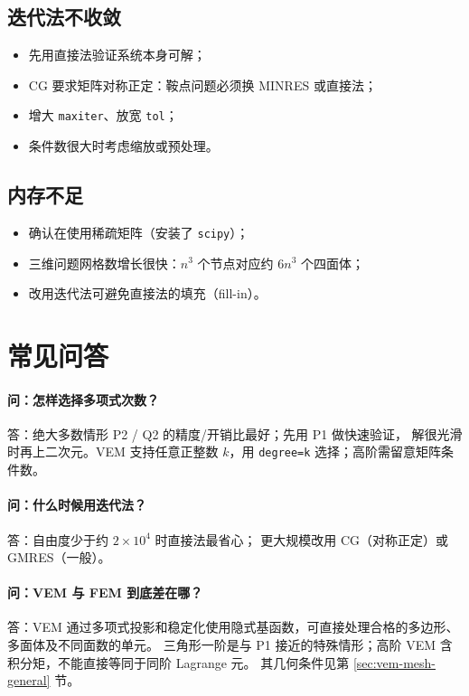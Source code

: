 \documentclass[UTF8,11pt,oneside]{ctexbook}
\theoremstyle{definition}
\theoremstyle{plain}
\newcommand{\code}[1]{\texttt{#1}}
\begin{document}
\subsection{迭代法不收敛}

\begin{itemize}[itemsep=0.2em]
  \item 先用直接法验证系统本身可解；
  \item CG 要求矩阵对称正定：鞍点问题必须换 MINRES 或直接法；
  \item 增大 \code{maxiter}、放宽 \code{tol}；
  \item 条件数很大时考虑缩放或预处理。
\end{itemize}

\subsection{内存不足}

\begin{itemize}[itemsep=0.2em]
  \item 确认在使用稀疏矩阵（安装了 \code{scipy}）；
  \item 三维问题网格数增长很快：$n^3$ 个节点对应约 $6n^3$ 个四面体；
  \item 改用迭代法可避免直接法的填充（fill-in）。
\end{itemize}

\section{常见问答}

\paragraph{问：怎样选择多项式次数？}
答：绝大多数情形 P2 / Q2 的精度/开销比最好；先用 P1 做快速验证，
解很光滑时再上二次元。VEM 支持任意正整数 $k$，用 \code{degree=k} 选择；高阶需留意矩阵条件数。

\paragraph{问：什么时候用迭代法？}
答：自由度少于约 $2\times10^4$ 时直接法最省心；
更大规模改用 CG（对称正定）或 GMRES（一般）。

\paragraph{问：VEM 与 FEM 到底差在哪？}
答：VEM 通过多项式投影和稳定化使用隐式基函数，可直接处理合格的多边形、多面体及不同面数的单元。
三角形一阶是与 P1 接近的特殊情形；高阶 VEM 含积分矩，不能直接等同于同阶 Lagrange 元。
其几何条件见第 \ref{sec:vem-mesh-general} 节。
\end{document}
